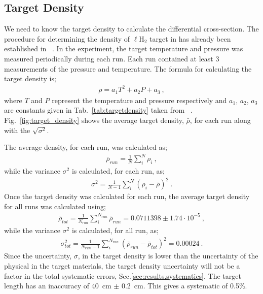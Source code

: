 \subsection{Target Density}\label{sec:analysis.target_density}

We need to know the target density to calculate the differential cross-section. The procedure for determining the density of $\ell$H$_2$ target in  has already been established in ~\cite{clas.target.density}. In the  experiment, the target temperature and pressure was measured periodically during each run. Each run contained at least 3 measurements of the pressure and temperature. The formula for calculating the target density is;
\begin{align}
\rho = a_1T^2 + a_2P +a_3 \label{eq:target_density} \ ,
\end{align} 
where $T$ and $P$ represent the temperature and pressure respectively and $a_1$, $a_2$, $a_3$ are constants given in Tab.~\ref{tab:targetdensity} taken from ~\cite{mccarty}. Fig.~\ref{fig:target_density} shows the average target density, $\bar \rho$, for each run along with the $\sqrt{\sigma^2}$.

The average density, for each run, was calculated as;
\begin{align}
\bar \rho_{run} = \frac{1}{N}\sum_i^N \rho_i \ ,
\end{align} 
while the variance $\sigma^2$ is calculated, for each run, as;
\begin{align}
\sigma^2 = \frac{1}{N - 1}\sum_i^N (\rho_i - \bar \rho)^2 \ .
\end{align}
Once the target density was calculated for each run, the average target density for all  runs was calculated using;
\begin{align}
\bar \rho_{tot} = \frac{1}{N_{run}}\sum_i^{N_{run}} \bar \rho_{run} = 0.0711398 \pm 1.74 \cdot10^{-5}\ ,
\end{align} 
while the variance $\sigma^2$ is calculated, for all  run, as;
\begin{align}
\sigma_{tot}^2 = \frac{1}{N_{run} -1}\sum_i^{N_{run}} (\bar \rho_{run} - \bar \rho_{tot})^2 = 0.00024 \ .
\end{align}
Since the uncertainty, $\sigma$, in the target density is lower than the uncertainty of the physical in the target materials, the target density uncertainty will not be a factor in the total systematic errors, Sec.\ref{sec:results.systematics}. The target length has an inaccuracy of 40~cm $\pm$ 0.2~cm. This gives a systematic of 0.5\%. 

